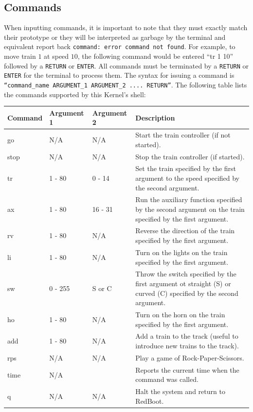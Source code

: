 \documentclass[12pt]{article}
\begin{document}
\subsection{Commands}
When inputting commands, it is important to note that they must exactly match their prototype or they will be interpreted as garbage by the terminal and equivalent report back \texttt{command: error command not found}.  For example, to move train $1$ at speed $10$, the following command would be entered ``tr 1 10'' followed by a \texttt{RETURN} or \texttt{ENTER}.  All commands must be terminated by a \texttt{RETURN} or \texttt{ENTER} for the terminal to process them.  The syntax for issuing a command is \texttt{``command\_name ARGUMENT\_1 ARGUMENT\_2 .... RETURN''}.  The following table lists the commands supported by this Kernel's shell:
\begin{center}
  \begin{tabular}{|l|l|l|p{}|}
    \hline
    {\bf Command} & {\bf Argument 1} & {\bf Argument 2} & {\bf Description} \\\hline
    go   & N/A     & N/A     & Start the train controller (if not started). \\\hline
    stop & N/A     & N/A     & Stop the train controller (if started). \\\hline
    tr   & 1 - 80  & 0 - 14  & Set the train specified by the first argument to the speed specified by the second argument.\\\hline
    ax   & 1 - 80  & 16 - 31 & Run the auxiliary function specified by the second argument on the train specified by the first argument.\\\hline
    rv   & 1 - 80  & N/A     & Reverse the direction of the train specified by the first argument. \\\hline
    li   & 1 - 80  & N/A     & Turn on the lights on the train specified by the first argument. \\\hline
    sw   & 0 - 255 & S or C  & Throw the switch specified by the first argument ot straight (S) or curved (C) specified by the second argument. \\\hline
    ho   & 1 - 80  & N/A     & Turn on the horn on the train specified by the first argument. \\\hline
    add  & 1 - 80  & N/A     & Add a train to the track (useful to introduce new trains to the track). \\\hline
    rps  & N/A     & N/A     & Play a game of Rock-Paper-Scissors. \\\hline
    time & N/A     &         & Reports the current time when the command was called. \\\hline
    q    & N/A     & N/A     & Halt the system and return to RedBoot. \\\hline
  \end{tabular}
  \\[2\baselineskip]
\end{center}
\end{document}
